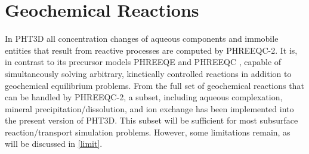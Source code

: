 \section{Geochemical Reactions}

In PHT3D all concentration changes of aqueous components and
immobile entities that result from reactive processes are computed
by PHREEQC-2. It is, in contrast to its precursor models PHREEQE
\cite[]{parkhurst80} and PHREEQC \cite[]{parkhurst95}, capable of
simultaneously solving arbitrary, kinetically controlled reactions
in addition to geochemical equilibrium problems. From the full set
of geochemical reactions that can be handled by PHREEQC-2, a
subset, including aqueous complexation, mineral
precipitation/dissolution, and ion exchange has been implemented
into the present version of PHT3D. This subset will be sufficient
for most subsurface reaction/transport simulation problems.
However, some limitations remain, as will be discussed in
\ref{limit}.

